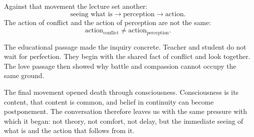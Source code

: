 Against that movement the lecture set another:
\begin{equation}
\text{seeing what is}
   \longrightarrow
\text{perception}
   \longrightarrow
\text{action}.
\end{equation}
The action of conflict and the action of perception are not the same:
\begin{equation}
\text{action}_{\mathrm{conflict}}
   \neq
\text{action}_{\mathrm{perception}}.
\end{equation}

The educational passage made the inquiry concrete. Teacher and student do not wait for perfection. They begin with the shared fact of conflict and look together. The love passage then showed why battle and compassion cannot occupy the same ground.

The final movement opened death through consciousness. Consciousness is its content, that content is common, and belief in continuity can become postponement. The conversation therefore leaves us with the same pressure with which it began: not theory, not comfort, not delay, but the immediate seeing of what is and the action that follows from it.